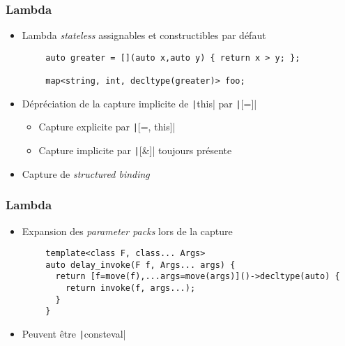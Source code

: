 \documentclass[C++.tex]{subfiles}
\begin{document}
\begin{frame}[fragile]
	\frametitle{Lambda}
	\begin{itemize}
		\item Lambda \textit{stateless} assignables et constructibles par défaut

	\end{itemize}

	\begin{verbatim}
		auto greater = [](auto x,auto y) { return x > y; };

		map<string, int, decltype(greater)> foo;
	\end{verbatim}

	\begin{itemize}
		\item Dépréciation de la capture implicite de \texttt|this| par \texttt|[=]|
		\begin{itemize}
			\item Capture explicite par \texttt|[=, this]|


			\item Capture implicite par \texttt|[&]| toujours présente
		\end{itemize}
		\item Capture de \textit{structured binding}
	\end{itemize}
\end{frame}

\begin{frame}[fragile]
	\frametitle{Lambda}
	\begin{itemize}
		\item Expansion des \textit{parameter packs} lors de la capture
	\end{itemize}

	\begin{verbatim}
		template<class F, class... Args>
		auto delay_invoke(F f, Args... args) {
		  return [f=move(f),...args=move(args)]()->decltype(auto) {
		    return invoke(f, args...); 
		  }
		}
	\end{verbatim}

	\begin{itemize}
		\item Peuvent être \texttt|consteval|
	\end{itemize}
\end{frame}
\end{document}
